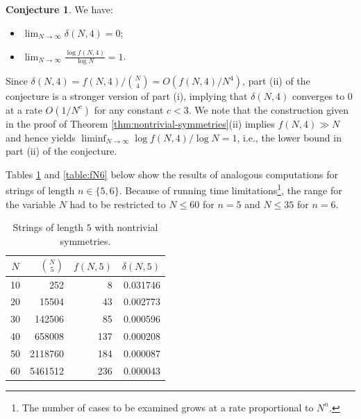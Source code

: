 \documentclass[10pt]{article}
\theoremstyle{definition}
\newtheorem{conjecture}[theorem]{Conjecture}
\numberwithin{equation}{section}
\numberwithin{lemma}{section}
\begin{document}
\begin{conjecture}
\label{conj:fN4}
We have:
\begin{itemize}
\item[(i)]
$\displaystyle \lim_{N\to\infty} \delta(N,4)=0$;
\item[(ii)]
$\displaystyle \lim_{N\to\infty}\frac{\log f(N,4)}{\log N}=1$.
\end{itemize}
\end{conjecture}

Since $\delta(N,4)=f(N,4)/\binom{N}{4}=O(f(N,4)/N^4)$, 
part (ii) of the conjecture is a stronger version of part (i), implying
that $\delta(N,4)$ converges to $0$ at a rate $O(1/N^c)$ for any
constant $c<3$.
We note that the construction given 
in the proof of Theorem \ref{thm:nontrivial-symmetries}(ii)
implies $f(N,4)\gg N$ and hence yields 
$\liminf_{N\to\infty}\log f(N,4)/\log N=1$, i.e., the lower bound 
in part (ii) of the conjecture.



Tables \ref{table:fN5} and \ref{table:fN6} below show the results
of analogous computations for strings of length $n\in\{5,6\}$.  Because
of running time limitations\footnote{The number of cases to be examined
grows at a rate proportional to $N^n$.},
the range for the variable $N$ had to be
restricted to $N\le60$ for $n=5$ and $N\le 35$ for $n=6$.

\begin{table}[H]
\begin{center}
\addtolength{\tabcolsep}{6pt}
\renewcommand{\arraystretch}{1.5}
\begin{tabular}{|c|r|r|r|}
\hline
$N$ & $\binom{N}{5}$ & $f(N,5)$ & $\delta(N,5)$ 
\\
\hline
 10 & 252 & 8 & 0.031746 \\
 20 & 15504 & 43 & 0.002773 \\
 30 & 142506 & 85 & 0.000596 \\
 40 & 658008 & 137 & 0.000208 \\
 50 & 2118760 & 184 & 0.000087 \\
 60 & 5461512 & 236 & 0.000043 \\
 \hline
\end{tabular}
\caption{Strings of length $5$ with nontrivial symmetries.
}
\label{table:fN5}
\end{center}
\end{table}
\end{document}
